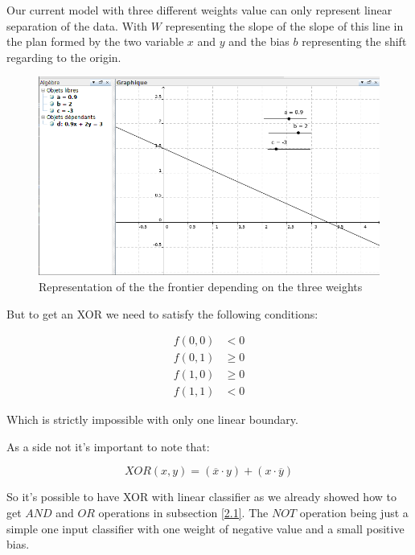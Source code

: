 
Our current model with three different weights value can only represent linear separation of the data.
With $W$ representing the slope of the slope of this line in the plan formed by the two variable $x$ and $y$ and the
bias $b$ representing the shift regarding to the origin.

\begin{figure}[h!]
    \begin{center}
        \includegraphics[width=.6\linewidth]{../2_logic_XOR/xor_graph.png}
        \caption{Representation of the the frontier depending on the three weights}
    \end{center}
\end{figure}

But to get an XOR we need to satisfy the following conditions:

\begin{align*}
    f(0,0) &< 0 \\
    f(0,1) &\geq 0 \\
    f(1,0) &\geq 0 \\
    f(1,1) &< 0
\end{align*}

Which is strictly impossible with only one linear boundary.

As a side not it's important to note that:

\[
    XOR(x, y) = \left( \overline{x} \cdot y \right) + ( x \cdot \overline{y} )
\]

So it's possible to have XOR with linear classifier as we already showed how to get $AND$ and $OR$ operations
in subsection \ref{2.1}.
The $NOT$ operation being just a simple one input classifier with one weight of negative value and a small positive bias.



